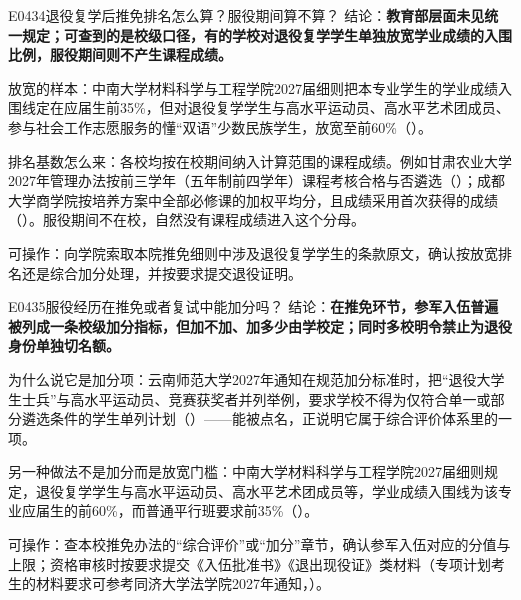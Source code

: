 \begin{qa}{E0434}{退役复学后推免排名怎么算？服役期间算不算？}
结论：\textbf{教育部层面未见统一规定；可查到的是校级口径，有的学校对退役复学学生单独放宽学业成绩的入围比例，服役期间则不产生课程成绩。}

放宽的样本：中南大学材料科学与工程学院2027届细则把本专业学生的学业成绩入围线定在应届生前35\%，但对退役复学学生与高水平运动员、高水平艺术团成员、参与社会工作志愿服务的懂“双语”少数民族学生，放宽至前60\%（）。

排名基数怎么来：各校均按在校期间纳入计算范围的课程成绩。例如甘肃农业大学2027年管理办法按前三学年（五年制前四学年）课程考核合格与否遴选（）；成都大学商学院按培养方案中全部必修课的加权平均分，且成绩采用首次获得的成绩（）。服役期间不在校，自然没有课程成绩进入这个分母。

可操作：向学院索取本院推免细则中涉及退役复学学生的条款原文，确认按放宽排名还是综合加分处理，并按要求提交退役证明。
\end{qa}

\begin{qa}{E0435}{服役经历在推免或者复试中能加分吗？}
结论：\textbf{在推免环节，参军入伍普遍被列成一条校级加分指标，但加不加、加多少由学校定；同时多校明令禁止为退役身份单独切名额。}

为什么说它是加分项：云南师范大学2027年通知在规范加分标准时，把“退役大学生士兵”与高水平运动员、竞赛获奖者并列举例，要求学校不得为仅符合单一或部分遴选条件的学生单列计划（）——能被点名，正说明它属于综合评价体系里的一项。

另一种做法不是加分而是放宽门槛：中南大学材料科学与工程学院2027届细则规定，退役复学学生与高水平运动员、高水平艺术团成员等，学业成绩入围线为该专业应届生的前60\%，而普通平行班要求前35\%（）。

可操作：查本校推免办法的“综合评价”或“加分”章节，确认参军入伍对应的分值与上限；资格审核时按要求提交《入伍批准书》《退出现役证》类材料（专项计划考生的材料要求可参考同济大学法学院2027年通知，）。
\end{qa}

